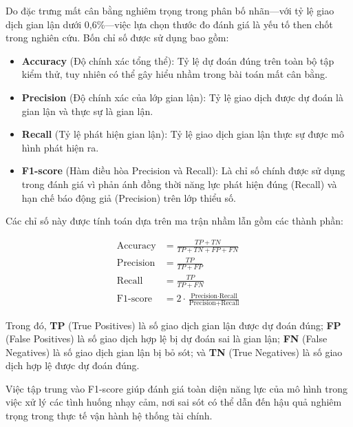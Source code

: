 Do đặc trưng mất cân bằng nghiêm trọng trong phân bố nhãn—với tỷ lệ giao dịch gian lận dưới 0,6\%—việc lựa chọn thước đo đánh giá là yếu tố then chốt trong nghiên cứu. Bốn chỉ số được sử dụng bao gồm:

\begin{itemize}
    \item \textbf{Accuracy} (Độ chính xác tổng thể): Tỷ lệ dự đoán đúng trên toàn bộ tập kiểm thử, tuy nhiên có thể gây hiểu nhầm trong bài toán mất cân bằng.
    \item \textbf{Precision} (Độ chính xác của lớp gian lận): Tỷ lệ giao dịch được dự đoán là gian lận và thực sự là gian lận.
    \item \textbf{Recall} (Tỷ lệ phát hiện gian lận): Tỷ lệ giao dịch gian lận thực sự được mô hình phát hiện ra.
    \item \textbf{F1-score} (Hàm điều hòa Precision và Recall): Là chỉ số chính được sử dụng trong đánh giá vì phản ánh đồng thời năng lực phát hiện đúng (Recall) và hạn chế báo động giả (Precision) trên lớp thiểu số.
\end{itemize}

Các chỉ số này được tính toán dựa trên ma trận nhầm lẫn gồm các thành phần: 

\begin{align}
\text{Accuracy}  &= \frac{TP + TN}{TP + TN + FP + FN} \label{eq:accuracy} \\
\text{Precision} &= \frac{TP}{TP + FP} \label{eq:precision} \\
\text{Recall}    &= \frac{TP}{TP + FN} \label{eq:recall} \\
\text{F1-score}  &= 2 \cdot \frac{\text{Precision} \cdot \text{Recall}}{\text{Precision} + \text{Recall}} \label{eq:f1score}
\end{align}



Trong đó, \textbf{TP} (True Positives) là số giao dịch gian lận được dự đoán đúng; \textbf{FP} (False Positives) là số giao dịch hợp lệ bị dự đoán sai là gian lận; \textbf{FN} (False Negatives) là số giao dịch gian lận bị bỏ sót; và \textbf{TN} (True Negatives) là số giao dịch hợp lệ được dự đoán đúng.

Việc tập trung vào F1-score giúp đánh giá toàn diện năng lực của mô hình trong việc xử lý các tình huống nhạy cảm, nơi sai sót có thể dẫn đến hậu quả nghiêm trọng trong thực tế vận hành hệ thống tài chính.

